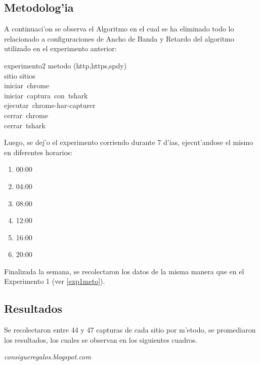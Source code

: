 \documentclass[a4paper,11pt,twocolumn]{article}
\begin{document}
\subsection{Metodolog'ia}

A continuaci'on se observa el Algoritmo en el cual se ha eliminado todo lo relacionado a configuraciones de Ancho de Banda y Retardo del algoritmo utilizado en el experimento anterior:

\begin{pseudocode}{experimento2}{ }
\FOR metodo \in (http,https,spdy) \DO \\
\BEGIN
	\FOR sitio \in sitios \DO \\
	\BEGIN
		iniciar\ chrome\\
		iniciar\ captura\ con\ tshark\\
		ejecutar\ chrome-har-capturer\\
		cerrar\ chrome\\
		cerrar\ tshark
	\END
\END
\end{pseudocode}

Luego, se dej'o el experimento corriendo durante 7 d'ias, ejecut'andose el mismo en diferentes horarios:

\begin{enumerate}
\item 00:00
\item 04:00
\item 08:00
\item 12:00
\item 16:00
\item 20:00
\end{enumerate}

Finalizada la semana, se recolectaron los datos de la misma manera que en el Experimento 1 (ver \ref{exp1meto}).

\subsection{Resultados}

Se recolectaron entre 44 y 47 capturas de cada sitio por m'etodo, se promediaron los resultados, los cuales se observan en los siguientes cuadros. 
\vspace*{3\baselineskip}

\emph{consigueregalos.blogspot.com}
\end{document}

